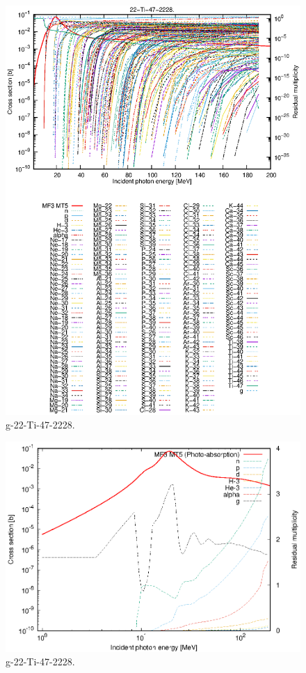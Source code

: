 \begin{figure}
 \includegraphics[width=\linewidth]{eps/g_22-Ti-47_2228.eps}
  \caption{g-22-Ti-47-2228.}
\end{figure}
\newpage \clearpage

\begin{figure}
 \includegraphics[width=\linewidth]{eps-log/g_22-Ti-47_2228.eps}
 \caption{g-22-Ti-47-2228.}
\end{figure}
\newpage \clearpage

